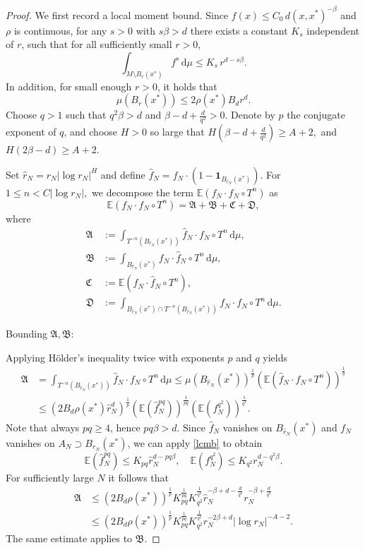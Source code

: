 \documentclass[11pt,twoside,a4paper,reqno]{amsart}
\renewcommand{\d}{\, \text{d}}
\newcommand{\E}{\mathbb{E}}
\def\one{{\mathbf{1}}}
\begin{document}
\begin{proof}
We first record a local moment bound. Since $f(x) \le C_0\,d(x,x^*)^{- \beta}$ and $\rho$ is continuous, for any $s>0$ with $s\beta>d$ there exists a constant $K_s$ independent of $r$, such that for all sufficiently small $r>0$,
\begin{equation}\label{lcmb}
\int_{M \setminus B_r(x^*)} f^s \d\mu \le K_s \, r^{d - s\beta}.
\end{equation}
In addition, for small enough $r>0$, it holds that
\begin{equation*}
\mu (B_r(x^*)) \leq 2 \rho(x^*) B_d r^d.
\end{equation*}
Choose $q>1$ such that $q^2\beta>d$ and $\beta-d+\frac{d}{q^2}>0$. Denote by $p$ the conjugate exponent of $q$, and choose $H>0$ so large that $H\left(\beta-d+\frac{d}{q^2}\right)\ge A+2,$ and $H(2\beta-d)\ge A+2$.

Set $\hat{r}_N=r_N|\log r_N|^H$ and define $\hat{f}_N=f_N \cdot \left(1-\one_{B_{\hat{r}_N}(x^*)}\right).$
For $1\leq n <C |\log r_N|,$ we decompose the term $\E\left(f_N \cdot f_N\circ T^n\right)$ as
$$
\E\left(f_N \cdot f_N\circ T^n\right)=\mathfrak{A} + \mathfrak{B} + \mathfrak{C} +\mathfrak{D},
$$
where
$$
\begin{aligned}
\mathfrak{A} &:= \int_{T^{-n}(B_{\hat{r}_N}(x^*))} \hat{f}_N \cdot f_N \circ T^n \d\mu, \\
\mathfrak{B} &:= \int_{B_{\hat{r}_N}(x^*)} f_N \cdot \hat{f}_N \circ T^n \d\mu, \\
\mathfrak{C} &:= \E \left(\hat{f}_N \cdot \hat{f}_N \circ T^n\right), \\
\mathfrak{D} &:= \int_{B_{\hat{r}_N}(x^*) \cap T^{-n}(B_{\hat{r}_N}(x^*))} f_N \cdot f_N \circ T^n\d\mu.
\end{aligned}
$$


Bounding $\mathfrak{A}, \mathfrak{B}$:

Applying H\"{o}lder's inequality twice with exponents $p$ and $q$ yields
\begin{align*}
\mathfrak{A}&= \int_{T^{-n}(B_{\hat{r}_N}(x^*))} \hat{f}_N \cdot f_N \circ T^n \d\mu\leq\mu(B_{\hat{r}_N}(x^*))^{\frac{1}{p}} \left(\E\left(\hat{f}_N \cdot f_N \circ T^n \right) \right)^{\frac{1}{q}}\\
&\leq\left(2B_d\rho(x^*)\hat{r}_N^d\right)^{\frac{1}{p}} \left(\E (\hat{f}_N^{pq}) \right)^{\frac{1}{pq}} \left(\E (f_N^{q^2}) \right)^{\frac{1}{q^2}}.
\end{align*}
Note that always $pq \geq 4$, hence $p q \beta > d$. Since $\hat{f}_N$ vanishes on $B_{\hat r_N}(x^*)$ and $f_N$ vanishes on $A_N\supset B_{r_N}(x^*)$, we can apply \eqref{lcmb} to obtain
$$\E(\hat{f}_N^{pq})\le K_{pq} \hat{r}_N^{d-pq\beta},\quad\E(f_N^{q^2})\le K_{q^2}r_N^{d-q^2\beta}.
$$
For sufficiently large $N$ it follows that
\begin{align*}
\mathfrak{A}&\leq\left(2B_d\rho(x^*)\right)^{\frac{1}{p}}K_{pq}^{\frac{1}{pq}}
K_{q^2}^{\frac{1}{q^2}}\hat{r}_N^{-\beta+d-\frac{d}{q^2}} r_N^{-\beta+\frac{d}{q^2}}\\
&\leq\left(2B_d\rho(x^*)\right)^{\frac{1}{p}}K_{pq}^{\frac{1}{pq}}
K_{q^2}^{\frac{1}{q^2}}r_N^{-2\beta+d}|\log r_N|^{-A-2}.
\end{align*}
The same estimate applies to $\mathfrak{B}.$



\end{proof}
\end{document}
